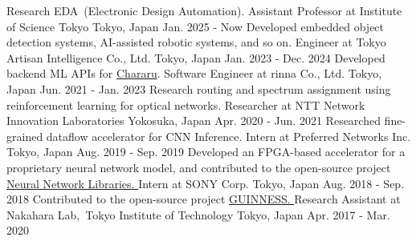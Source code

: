 
\begin{cventries}
  \eduentry
    {Research EDA~(Electronic Design Automation).} %
    {Assistant Professor at Institute of Science Tokyo} %
    {Tokyo, Japan} %
    {Jan. 2025 - Now} %
  \eduentry
    {Developed embedded object detection systems, AI-assisted robotic systems, and so on.} %
    {Engineer at Tokyo Artisan Intelligence Co., Ltd.} %
    {Tokyo, Japan} %
    {Jan.  2023 - Dec.  2024} %
  \eduentry
    {Developed backend ML APIs for \href{https://www.chararu.jp/}{Chararu}.} %
    {Software Engineer at rinna Co., Ltd.} %
    {Tokyo, Japan} %
    {Jun. 2021 - Jan.  2023} %
  \eduentry
    {Research routing and spectrum assignment using reinforcement learning for optical networks. } %
    {Researcher at NTT Network Innovation Laboratories} %
    {Yokosuka, Japan} %
    {Apr. 2020 - Jun. 2021} %
  \eduentry
    {Researched fine-grained dataflow accelerator for CNN Inference. } %
    {Intern at Preferred Networks Inc.} %
    {Tokyo, Japan} %
    {Aug. 2019 - Sep. 2019} %
  \eduentry
    {Developed an FPGA-based accelerator for a proprietary neural network model, and contributed to the open-source project \href{https://github.com/sony/nnabla}{Neural Network Libraries. }} %
    {Intern at SONY Corp.} %
    {Tokyo, Japan} %
    {Aug. 2018 - Sep. 2018} %
  \eduentry
    {Contributed to the open-source project \href{https://github.com/HirokiNakahara/GUINNESS}{GUINNESS. }} %
    {Research Assistant at Nakahara Lab,\ Tokyo Institute of Technology} 
    {Tokyo, Japan} %
    {Apr. 2017 - Mar. 2020} %

\end{cventries}
